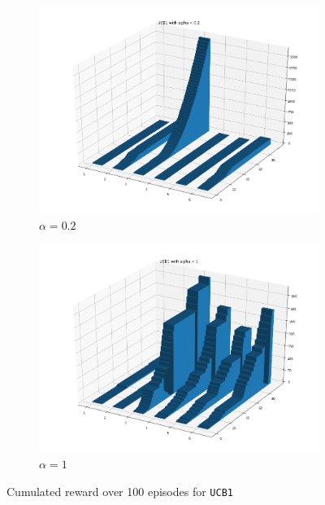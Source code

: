 \documentclass[11pt]{article}
\numberwithin{figure}{section} %
\begin{document}
\begin{figure}[H]
    \centering
    \begin{subfigure}{.5\textwidth}
        \centering
        \includegraphics[width=1\linewidth]{images/UCB1_bar_alpha_02}
        \caption{$\alpha = 0.2$}
        \label{fig:bar_02}
    \end{subfigure}%
    \begin{subfigure}{.5\textwidth}
        \centering
        \includegraphics[width=1\linewidth]{images/UCB1_bar_alpha_1}
        \caption{$\alpha = 1$}
        \label{fig:bar_1}
    \end{subfigure}
		\caption{Cumulated reward over 100 episodes for \texttt{UCB1}}
\label{fig:histo_3d}
\end{figure}
\end{document}
